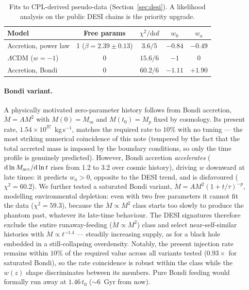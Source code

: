 \documentclass[11pt]{article}
\newcommand{\Macc}{M_{\rm acc}}
\begin{document}
\begin{table}[h]
\centering
\begin{tabular}{lcccc}
\toprule
Model & Free params & $\chi^2/\mathrm{dof}$ & $w_0$ & $w_a$ \\
\midrule
Accretion, power law & 1 ($\beta = 2.39\pm0.13$) & $3.6/5$ & $-0.84$ & $-0.49$ \\
$\Lambda$CDM ($w=-1$) & 0 & $15.6/6$ & $-1$ & $0$ \\
Accretion, Bondi & 0 & $60.2/6$ & $-1.11$ & $+1.90$ \\
\bottomrule
\end{tabular}
\caption{Fits to CPL-derived pseudo-data (Section~\ref{sec:desi}). A likelihood analysis on the public DESI chains is the priority upgrade.}
\label{tab:fits}
\end{table}

\paragraph{Bondi variant.} A physically motivated zero-parameter history follows from Bondi accretion, $\dot M = A M^2$ with $M(0) = M_m$ and $M(t_0) = M_p$ fixed by cosmology. Its present rate, $1.54\times10^{37}$~kg\,s$^{-1}$, matches the required rate to $10\%$ with no tuning --- the most striking numerical coincidence of this note (tempered by the fact that the total accreted mass is imposed by the boundary conditions, so only the time profile is genuinely predicted). However, Bondi accretion \emph{accelerates} ($\mathrm{d}\ln\Macc/\mathrm{d}\ln t$ rises from 1.2 to 3.2 over cosmic history), driving $w$ downward at late times: it predicts $w_a > 0$, opposite to the DESI trend, and is disfavoured ($\chi^2 = 60.2$). We further tested a saturated Bondi variant, $\dot M = A M^2 (1+t/\tau)^{-p}$, modelling environmental depletion: even with two free parameters it cannot fit the data ($\chi^2 = 59.3$), because the $\dot M \propto M^2$ class starts too slowly to produce the phantom past, whatever its late-time behaviour. The DESI signatures therefore exclude the entire runaway-feeding ($\dot M \propto M^2$) class and select near-self-similar histories with $\dot M \propto t^{\sim 1.4}$ --- steadily increasing supply, as for a black hole embedded in a still-collapsing overdensity. Notably, the present injection rate remains within $10\%$ of the required value across all variants tested ($0.93\times$ for saturated Bondi), so the rate coincidence is robust within the class while the $w(z)$ shape discriminates between its members. Pure Bondi feeding would formally run away at $1.46\,t_0$ ($\sim 6$~Gyr from now).
\end{document}
